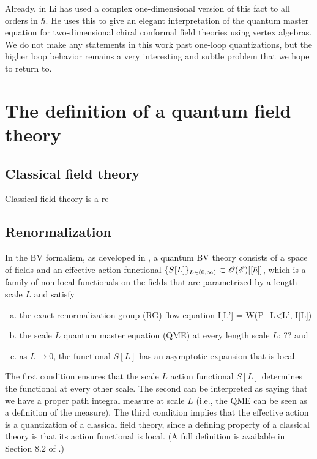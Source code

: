 \documentclass[10pt]{amsart}
\begin{document}
Already, in \cite{LiVertex} Li has used a complex one-dimensional version of this fact to all orders in $\hbar$. 
He uses this to give an elegant interpretation of the quantum master equation for two-dimensional chiral conformal field theories using vertex algebras.
We do not make any statements in this work past one-loop
quantizations, but the higher loop behavior remains a very interesting and subtle problem that we hope to return to.

\section{The definition of a quantum field theory}

\subsection{Classical field theory}

Classical field theory is a re

\subsection{Renormalization}

In the BV formalism, as developed in \cite{CostelloRenormalization,CG1,CG2}, 
a quantum BV theory consists of a space of fields and an effective action functional $\{S[L]\}_{L \in (0,\infty)} \subset \mathscr O(\mathscr E)[[\hbar]]$,
which is a family of non-local functionals on the fields that are parametrized by a length scale $L$ 
and satisfy
\begin{enumerate}[(a)]
\item the exact renormalization group (RG) flow equation
\ben
I[L'] = W(P_{L<L'}, I[L])
\een
\item the scale $L$ quantum master equation (QME) at every length scale $L$:
\ben
??
\een
and
\item as $L \to 0$, the functional $S[L]$ has an asymptotic expansion that is local.
\end{enumerate}
The first condition ensures that the scale $L$ action functional $S[L]$ determines the functional at every other scale.
The second can be interpreted as saying that we have a proper path integral measure at scale $L$ 
(i.e., the QME can be seen as a definition of the measure).
The third condition implies that the effective action is a quantization of a classical field theory,
since a defining property of a classical theory is that its action functional is local.
(A full definition is available in Section 8.2 of \cite{CG2}.)
\end{document}
